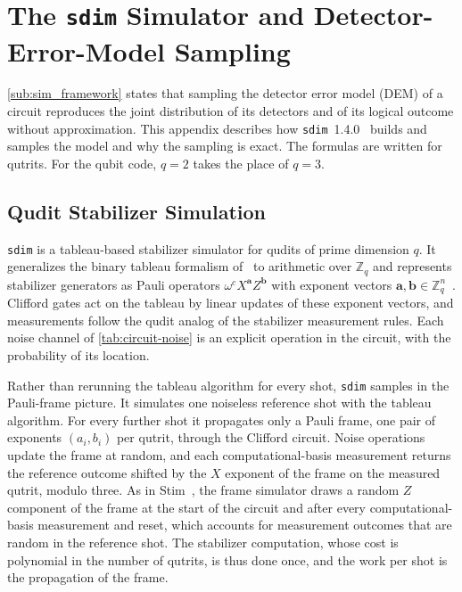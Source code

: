 \section{The \texttt{sdim} Simulator and Detector-Error-Model Sampling}
\label{sec:sdim-dem}

\autoref{sub:sim_framework} states that sampling the detector error model (DEM) of a circuit reproduces the joint distribution of its detectors and of its logical outcome without approximation. This appendix describes how \texttt{sdim}~1.4.0~\cite{sdim} builds and samples the model and why the sampling is exact. The formulas are written for qutrits. For the qubit code, $q = 2$ takes the place of $q = 3$.

\subsection{Qudit Stabilizer Simulation}
\label{app:sdim-simulator}

\texttt{sdim} is a tableau-based stabilizer simulator for qudits of prime dimension $q$. It generalizes the binary tableau formalism of~\cite{Aaronson2004} to arithmetic over $\mathbb{Z}_q$ and represents stabilizer generators as Pauli operators $\omega^c X^{\mathbf{a}} Z^{\mathbf{b}}$ with exponent vectors $\mathbf{a}, \mathbf{b} \in \mathbb{Z}_q^n$~\cite{Gottesman1999,Hostens2005}. Clifford gates act on the tableau by linear updates of these exponent vectors, and measurements follow the qudit analog of the stabilizer measurement rules. Each noise channel of \autoref{tab:circuit-noise} is an explicit operation in the circuit, with the probability of its location.

Rather than rerunning the tableau algorithm for every shot, \texttt{sdim} samples in the Pauli-frame picture. It simulates one noiseless reference shot with the tableau algorithm. For every further shot it propagates only a Pauli frame, one pair of exponents $(a_i, b_i)$ per qutrit, through the Clifford circuit. Noise operations update the frame at random, and each computational-basis measurement returns the reference outcome shifted by the $X$ exponent of the frame on the measured qutrit, modulo three. As in Stim~\cite{Gidney2021Stim}, the frame simulator draws a random $Z$ component of the frame at the start of the circuit and after every computational-basis measurement and reset, which accounts for measurement outcomes that are random in the reference shot. The stabilizer computation, whose cost is polynomial in the number of qutrits, is thus done once, and the work per shot is the propagation of the frame.

